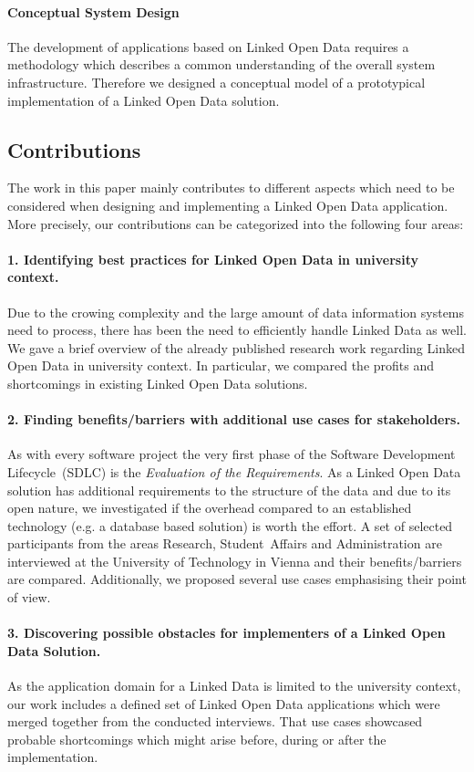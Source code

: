\documentclass{article}
\begin{document}
\paragraph{Conceptual System Design}
The development of applications based on Linked Open Data requires a methodology which describes a common understanding of the overall system infrastructure. Therefore we designed a conceptual model of a prototypical implementation of a Linked Open Data solution. 

\subsection{Contributions}
The work in this paper mainly contributes to different aspects which need to be considered when designing and implementing a Linked Open Data application.
More precisely, our contributions can be categorized into the following four areas:
\paragraph{1. Identifying best practices for Linked Open Data in university context.}
Due to the crowing complexity and the large amount of data information systems need to process, there has been the need to efficiently handle Linked Data as well. We gave a brief overview of the already published research work regarding Linked Open Data in university context. In particular, we compared the profits and shortcomings in existing Linked Open Data solutions. 
\paragraph{2. Finding benefits/barriers with additional use cases for stakeholders.}
As with every software project the very first phase of the Software Development Lifecycle~(SDLC) is the \textit{Evaluation of the Requirements}. As a Linked Open Data solution has additional requirements to the structure of the data and due to its open nature, we investigated if the overhead compared to an established technology (e.g. a database based solution) is worth the effort. A set of selected participants from the areas Research, Student~Affairs and Administration are interviewed at the University of Technology in Vienna and their benefits/barriers are compared. Additionally, we proposed several use cases emphasising their point of view. 
\paragraph{3. Discovering possible obstacles for implementers of a Linked Open Data Solution.}
As the application domain for a Linked Data is limited to the university context, our work includes a defined set of Linked Open Data applications which were merged together from the conducted interviews. That use cases showcased probable shortcomings which might arise before, during or after the implementation.
\end{document}

